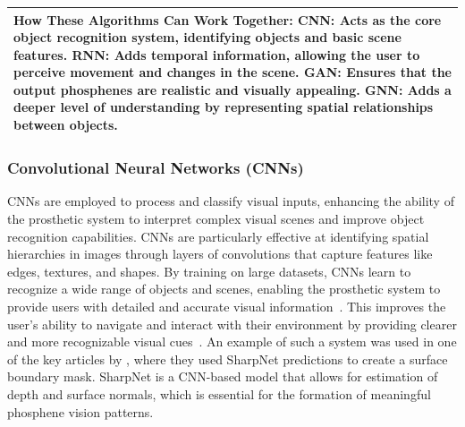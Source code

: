 \documentclass[twocolumn,10pt]{article}
\begin{document}
\begin{table}[ht!]
\begin{tabularx}{\textwidth}{|X|X|X|X|X|}
            \multicolumn{5}{|p{\dimexpr\textwidth-2\tabcolsep}|}{
            \textbf{How These Algorithms Can Work Together:}\newline
            \textbf{CNN:} Acts as the core object recognition system, identifying objects and basic scene features.\newline
            \textbf{RNN:} Adds temporal information, allowing the user to perceive movement and changes in the scene.\newline
            \textbf{GAN:} Ensures that the output phosphenes are realistic and visually appealing.\newline
            \textbf{GNN:} Adds a deeper level of understanding by representing spatial relationships between objects.
            }                                                                                                                                                                                                                                                                         \\ \hline
      \end{tabularx}
\end{table}

\subsubsection*{Convolutional Neural Networks (CNNs)}
CNNs are employed to process and classify visual inputs, enhancing the ability
of the prosthetic system to interpret complex visual scenes and improve object
recognition capabilities. CNNs are particularly effective at identifying spatial
hierarchies in images through layers of convolutions that capture features like
edges, textures, and shapes. By training on large datasets, CNNs learn to
recognize a wide range of objects and scenes, enabling the prosthetic system to
provide users with detailed and accurate visual
information~\parencite{petrosyanDecodingInterpretingCortical2021a}. This
improves the user's ability to navigate and interact with their environment by
providing clearer and more recognizable visual
cues~\parencite{maheswaranathanInterpretingRetinalNeural2023}. An example of
such a system was used in one of the key articles by
\textcite{deruytervansteveninckRealworldIndoorMobility2022}, where they used
SharpNet predictions to create a surface boundary mask. SharpNet is a CNN-based
model that allows for estimation of depth and surface normals, which is
essential for the formation of meaningful phosphene vision patterns.
\end{document}

